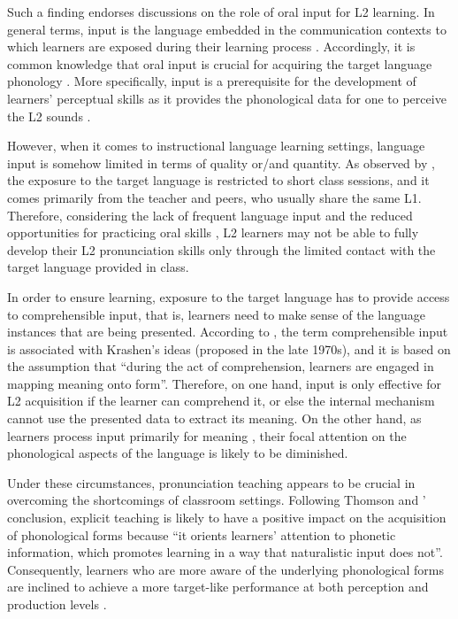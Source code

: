 \documentclass[english]{textolivre}
\begin{document}
Such a finding endorses discussions on the role of oral input for L2 learning. In general terms, input is the language embedded in the communication contexts to which learners are exposed during their learning process \cite{vanpatten_key_2019}. Accordingly, it is common knowledge that oral input is crucial for acquiring the target language phonology \cite{tyler2019}. More specifically, input is a prerequisite for the development of learners’ perceptual skills as it provides the phonological data for one to perceive the L2 sounds \cite{liakin_mobilizing_2017, tyler2019}.  

However, when it comes to instructional language learning settings, language input is somehow limited in terms of quality or/and quantity. As observed by \textcite{munoz_symmetries_2008}, the exposure to the target language is restricted to short class sessions, and it comes primarily from the teacher and peers, who usually share the same L1. Therefore, considering the lack of frequent language input and the reduced opportunities for practicing oral skills \cite{carlet_improving_2018}, L2 learners may not be able to fully develop their L2 pronunciation skills only through the limited contact with the target language provided in class.

In order to ensure learning, exposure to the target language has to provide access to comprehensible input, that is, learners need to make sense of the language instances that are being presented. According to \textcite[p. 46]{vanpatten_key_2019}, the term comprehensible input is associated with Krashen’s ideas (proposed in the late 1970s), and it is based on the assumption that “during the act of comprehension, learners are engaged in mapping meaning onto form”. Therefore, on one hand, input is only effective for L2 acquisition if the learner can comprehend it, or else the internal mechanism cannot use the presented data to extract its meaning. On the other hand, as learners process input primarily for meaning \cite{vanpatten_2008}, their focal attention on the phonological aspects of the language is likely to be diminished.

Under these circumstances, pronunciation teaching appears to be crucial in overcoming the shortcomings of classroom settings. Following Thomson and \textcite[p. 340]{derwing_efficacy_2018}' conclusion, explicit teaching is likely to have a positive impact on the acquisition of phonological forms because “it orients learners’ attention to phonetic information, which promotes learning in a way that naturalistic input does not”. Consequently, learners who are more aware of the underlying phonological forms are inclined to achieve a more target-like performance at both perception and production levels \cite{carlet_improving_2018}.
\end{document}
